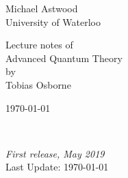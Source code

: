 \begin{titlepage}
	\centering\bfseries
	
	\Large{Michael Astwood}%
	\\[2ex]
	\large{University of Waterloo}\\
	
	
	\Large Lecture notes of\\[2ex]
	\Huge Advanced Quantum Theory\\[2ex]
	\Large by\\[2ex]
	\Large Tobias Osborne
	
	\large \today
	
\end{titlepage}

\newpage

~\vfill
\thispagestyle{empty}

\noindent \textit{First release, May 2019}\\ %
\noindent Last Update: \today


%
